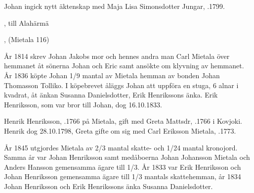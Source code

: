 Johan ingick nytt äktenskap med Maja Lisa Simonsdotter Jungar, .1799.
\begin{jhchildren}
  \item {}
  \item {}
  \item {}
  \item {}
  \item {}
  \item {}, till Alahärmä
  \item {}, (Mietala 116)
  \item {}
\end{jhchildren}
År 1814 skrev Johan Jakobs mor och hennes andra man Carl Mietala över hemmanet åt sönerna Johan och Eric samt ansökte om klyvning av hemmanet. År 1836 köpte Johan 1/9 mantal av Mietala hemman av bonden Johan Thomasson Tolliko. I köpebrevet åläggs Johan att uppföra en stuga, 6 alnar i kvadrat, åt änkan Susanna Danielsdotter, Erik Henrikssons änka. Erik Henriksson, som var bror till Johan, dog 16.10.1833.


Henrik Henriksson, .1766 på Mietala, gift med Greta Mattsdr, .1766 i Kovjoki. Henrik dog 28.10.1798, Greta gifte om sig med Carl Eriksson Mietala, .1773.
\begin{jhchildren}
  \item {}
  \item {}
  \item {}
  \item {}
  \item {}
  \item {}
  \item {}
\end{jhchildren}
År 1845 utgjordes Mietala av 2/3 mantal skatte- och 1/24 mantal kronojord. Samma år var Johan Henriksson samt medåboerna Johan Johansson Mietala och Anders Hansson gemensamma ägare till 1/3. År 1833 var Erik Henriksson och Johan Henriksson gemensamma ägare till 1/3 mantals skattehemman, år 1834 Johan Henriksson och Erik Henrikssons änka Susanna Danielsdotter.



